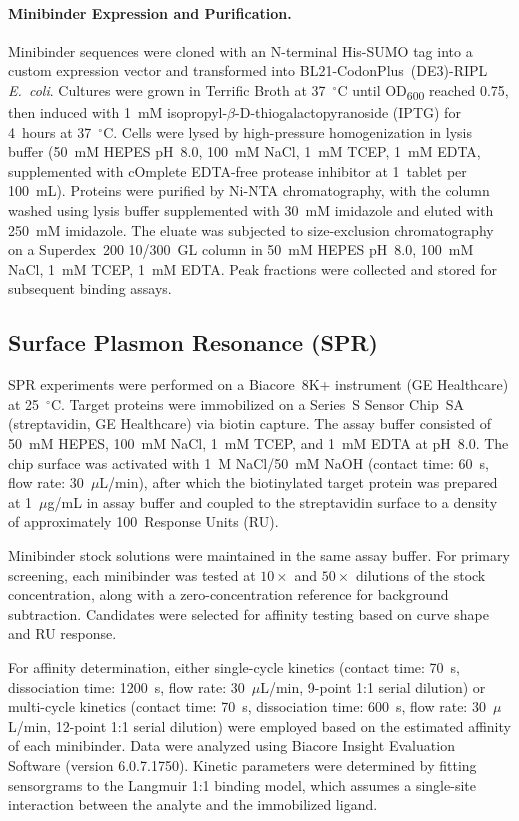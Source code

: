 \paragraph{Minibinder Expression and Purification.}
Minibinder sequences were cloned with an N-terminal His-SUMO tag into a custom expression vector and transformed into BL21-CodonPlus~(DE3)-RIPL \textit{E.~coli}. Cultures were grown in Terrific Broth at 37~$^\circ$C until OD\textsubscript{600} reached 0.75, then induced with 1~mM isopropyl-$\beta$-D-thiogalactopyranoside (IPTG) for 4~hours at 37~$^\circ$C. Cells were lysed by high-pressure homogenization in lysis buffer (50~mM HEPES pH~8.0, 100~mM NaCl, 1~mM TCEP, 1~mM EDTA, supplemented with cOmplete EDTA-free protease inhibitor at 1~tablet per 100~mL). Proteins were purified by Ni-NTA chromatography, with the column washed using lysis buffer supplemented with 30~mM imidazole and eluted with 250~mM imidazole. The eluate was subjected to size-exclusion chromatography on a Superdex~200 10/300~GL column in 50~mM HEPES pH~8.0, 100~mM NaCl, 1~mM TCEP, 1~mM EDTA. Peak fractions were collected and stored for subsequent binding assays.

\subsection{Surface Plasmon Resonance (SPR)}
\label{app:spr}

SPR experiments were performed on a Biacore~8K+ instrument (GE Healthcare) at 25~$^\circ$C. Target proteins were immobilized on a Series~S Sensor Chip~SA (streptavidin, GE Healthcare) via biotin capture. The assay buffer consisted of 50~mM HEPES, 100~mM NaCl, 1~mM TCEP, and 1~mM EDTA at pH~8.0. The chip surface was activated with 1~M NaCl/50~mM NaOH (contact time: 60~s, flow rate: 30~$\mu$L/min), after which the biotinylated target protein was prepared at 1~$\mu$g/mL in assay buffer and coupled to the streptavidin surface to a density of approximately 100~Response Units (RU).

Minibinder stock solutions were maintained in the same assay buffer. For primary screening, each minibinder was tested at $10\times$ and $50\times$ dilutions of the stock concentration, along with a zero-concentration reference for background subtraction. Candidates were selected for affinity testing based on curve shape and RU response.

For affinity determination, either single-cycle kinetics (contact time: 70~s, dissociation time: 1200~s, flow rate: 30~$\mu$L/min, 9-point 1:1 serial dilution) or multi-cycle kinetics (contact time: 70~s, dissociation time: 600~s, flow rate: 30~$\mu$L/min, 12-point 1:1 serial dilution) were employed based on the estimated affinity of each minibinder. Data were analyzed using Biacore Insight Evaluation Software (version 6.0.7.1750). Kinetic parameters were determined by fitting sensorgrams to the Langmuir 1:1 binding model, which assumes a single-site interaction between the analyte and the immobilized ligand.

